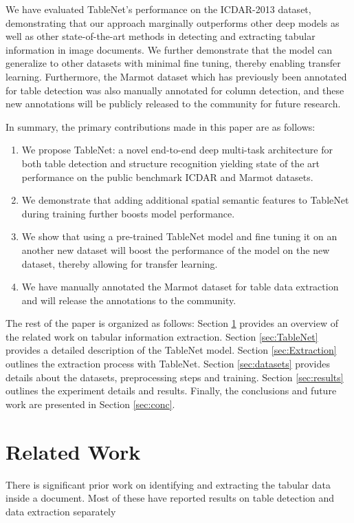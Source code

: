 \documentclass[conference]{IEEEtran}
\begin{document}
We have evaluated TableNet's performance on the ICDAR-2013 dataset, demonstrating that our approach marginally outperforms other deep models as well as other state-of-the-art methods in detecting and extracting tabular information in image documents. We further demonstrate that the model can generalize to other datasets with minimal fine tuning, thereby enabling transfer learning. Furthermore, the Marmot dataset which has previously been annotated for table detection was also manually annotated for column detection, and these new annotations will be publicly released to the community for future research.

In summary, the primary contributions made in this paper are as follows:

\begin{enumerate}
\item We propose TableNet: a novel end-to-end deep multi-task architecture for both table detection and structure recognition yielding state of the art performance on the public benchmark ICDAR and Marmot datasets.
\item We demonstrate that  adding additional spatial semantic features to TableNet during training further boosts model performance.
\item We show that using a pre-trained TableNet model and fine tuning it on an another new dataset will boost the performance of the model on the new dataset, thereby allowing for transfer learning. 
\item We have manually annotated the Marmot dataset for table data extraction and will release the annotations to the community.
\end{enumerate}

The rest of the paper is organized as follows: Section \ref{sec:relwork} provides an overview of the related work on tabular information extraction. Section \ref{sec:TableNet} provides a detailed description of the TableNet model. Section \ref{sec:Extraction} outlines the extraction process with TableNet. 
Section \ref{sec:datasets} provides details about the datasets, preprocessing steps and training. Section \ref{sec:results} outlines the experiment details and results. Finally, the conclusions and future work are presented in Section \ref{sec:conc}. 
\section{Related Work}
\label{sec:relwork}
There is significant prior work on identifying and extracting the tabular data inside a document. Most of these have reported results on table detection and data extraction separately \cite{embley2006table}
\end{document}

